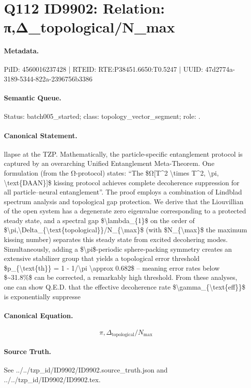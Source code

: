 \section*{Q112 ID9902: Relation: π,Δ\_topological/N\_max}
\paragraph{Metadata.}
PiID: 4560016237428 | RTEID: RTE:P38451.6650:T0.5247 | UUID: 47d2774a-3189-5344-822a-2396756b3386

\paragraph{Semantic Queue.}
Status: batch005\_started; class: topology\_vector\_segment; role: .

\paragraph{Canonical Statement.}
llapse at the TZP. Mathematically, the particle-specific entanglement protocol is captured by an overarching Unified Entanglement Meta-Theorem. One formulation (from the Ω-protocol) states: “The \$Ω[T\textasciicircum{}2 \textbackslash{}times T\textasciicircum{}2, \textbackslash{}pi, \textbackslash{}text\{DAAN\}]\$ kissing protocol achieves complete decoherence suppression for all particle–neural entanglement”. The proof employs a combination of Lindblad spectrum analysis and topological gap protection. We derive that the Liouvillian of the open system has a degenerate zero eigenvalue corresponding to a protected steady state, and a spectral gap \$\textbackslash{}lambda\_\{1\}\$ on the order of \$\textbackslash{}pi,\textbackslash{}Delta\_\{\textbackslash{}text\{topological\}\}/N\_\{\textbackslash{}max\}\$ (with \$N\_\{\textbackslash{}max\}\$ the maximum kissing number) separates this steady state from excited decohering modes. Simultaneously, adding a \$\textbackslash{}pi\$-periodic sphere-packing symmetry creates an extensive stabilizer group that yields a topological error threshold \$p\_\{\textbackslash{}text\{th\}\} = 1 - 1/\textbackslash{}pi \textbackslash{}approx 0.682\$ – meaning error rates below \$\textasciitilde{}31.8\%\$ can be corrected, a remarkably high threshold. From these analyses, one can show Q.E.D. that the effective decoherence rate \$\textbackslash{}gamma\_\{\textbackslash{}text\{eff\}\}\$ is exponentially suppresse

\paragraph{Canonical Equation.}
\[
\pi,\Delta_{\text{topological}}/N_{\max}
\]

\paragraph{Source Truth.}
See ../../tzp\_id/ID9902/ID9902.source\_truth.json and ../../tzp\_id/ID9902/ID9902.tex.
